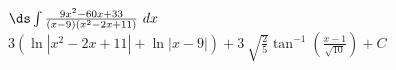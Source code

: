 {$\ds \int \frac{9x^2-60x+33}{(x-9)(x^2-2x+11)}\ dx$}
{$3 \left(\ln \left|x^2-2 x+11\right|+\ln |x-9|\right)+3 \
\sqrt{\frac{2}{5}} \tan ^{-1}\left(\frac{x-1}{\sqrt{10}}\right) +C$}
